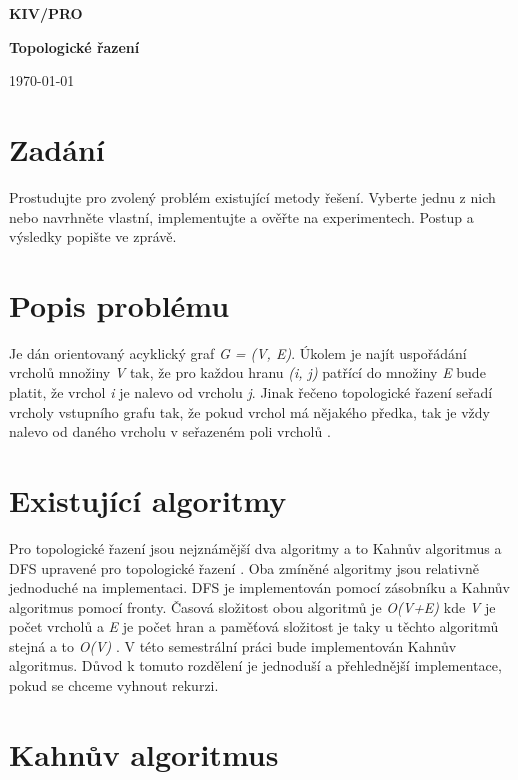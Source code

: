 \documentclass[12pt]{report}
\begin{document}
	
	{\centering
		
		\vspace{15mm}
		
		{\Huge\bfseries KIV/PRO}
		
		{\Huge\bfseries Topologické řazení}
		
		{\LARGE\today}
		\vspace{15mm}
		
	}

\section*{Zadání}
	Prostudujte pro zvolený problém existující metody řešení. Vyberte jednu z nich nebo navrhněte vlastní, implementujte a ověřte na experimentech. Postup a výsledky popište ve zprávě.
	
\section*{Popis problému}

	Je dán orientovaný acyklický graf \textit{G = (V, E)}. Úkolem je najít uspořádání vrcholů množiny \textit{V} tak, že pro každou hranu \textit{(i, j)} patřící do množiny \textit{E} bude platit, že vrchol \textit{i} je nalevo od vrcholu \textit{j}. Jinak řečeno topologické řazení seřadí vrcholy vstupního grafu tak, že pokud vrchol má nějakého předka, tak je vždy nalevo od daného vrcholu v seřazeném poli vrcholů \cite{r1}.
	
\section*{Existující algoritmy}
	Pro topologické řazení jsou nejznámější dva algoritmy a to Kahnův algoritmus \cite{r2} a DFS upravené pro topologické řazení \cite{r3}. Oba zmíněné algoritmy jsou relativně jednoduché na implementaci. DFS je implementován pomocí zásobníku a Kahnův algoritmus pomocí fronty. Časová složitost obou algoritmů je \textit{O(V+E)} kde \textit{V} je počet vrcholů a \textit{E} je počet hran a paměťová složitost je taky u těchto algoritmů stejná a to \textit{O(V)} \cite{r4}. V této semestrální práci bude implementován Kahnův algoritmus. Důvod k tomuto rozdělení je jednoduší a přehlednější implementace, pokud se chceme vyhnout rekurzi.
	
\newpage
\section*{Kahnův algoritmus}
\end{document}
